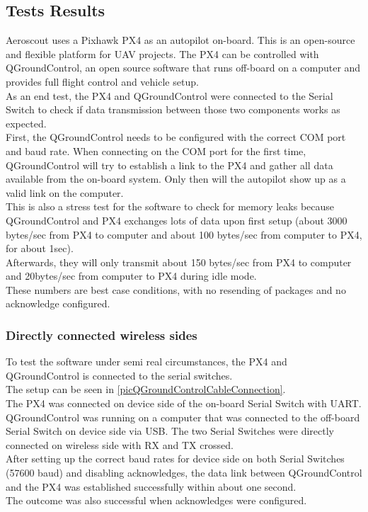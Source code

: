 \subsection{Tests Results}
Aeroscout uses a Pixhawk PX4 as an autopilot on-board. This is an open-source and flexible platform for UAV projects. The PX4 can be controlled with QGroundControl, an open source software that runs off-board on a computer and provides full flight control and vehicle setup.\\
As an end test, the PX4 and QGroundControl were connected to the Serial Switch to check if data transmission between those two components works as expected.\\
First, the QGroundControl needs to be configured with the correct COM port and baud rate. When connecting on the COM port for the first time, QGroundControl will try to establish a link to the PX4 and gather all data available from the on-board system. Only then will the autopilot show up as a valid link on the computer.\\
This is also a stress test for the software to check for memory leaks because QGroundControl and PX4 exchanges lots of data upon first setup (about 3000 bytes/sec from PX4 to computer and about 100 bytes/sec from computer to PX4, for about 1sec). \\ Afterwards, they will only transmit about 150 bytes/sec from PX4 to computer and 20bytes/sec from computer to PX4 during idle mode.\\
These numbers are best case conditions, with no resending of packages and no acknowledge configured.\\
%
\subsubsection{Directly connected wireless sides}
%
To test the software under semi real circumstances, the PX4 and QGroundControl is connected to the serial switches.\\
The setup can be seen in \autoref{picQGroundControlCableConnection}.\\
The PX4 was connected on device side of the on-board Serial Switch with UART. QGroundControl was running on a computer that was connected to the off-board Serial Switch on device side via USB. The two Serial Switches were directly connected on wireless side with RX and TX crossed. \\
After setting up the correct baud rates for device side on both Serial Switches (57600 baud) and disabling acknowledges, the data link between QGroundControl and the PX4 was established successfully within about one second.\\
The outcome was also successful when acknowledges were configured.\\
%
